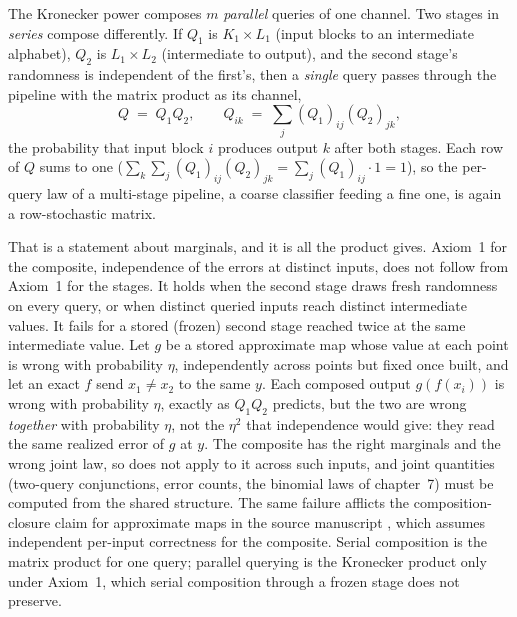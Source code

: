 \begin{remark}
\label{rem:channel-composition}
The Kronecker power composes $m$ \emph{parallel} queries of one channel. Two
stages in \emph{series} compose differently. If $Q_1$ is $K_1 \times L_1$
(input blocks to an intermediate alphabet), $Q_2$ is $L_1 \times L_2$
(intermediate to output), and the second stage's randomness is independent of
the first's, then a \emph{single} query passes through the pipeline with the
matrix product as its channel,
\[
  Q \;=\; Q_1 Q_2,
  \qquad
  Q_{ik} \;=\; \sum_{j} (Q_1)_{ij}(Q_2)_{jk},
\]
the probability that input block $i$ produces output $k$ after both stages.
Each row of $Q$ sums to one ($\sum_k \sum_j (Q_1)_{ij}(Q_2)_{jk} = \sum_j
(Q_1)_{ij} \cdot 1 = 1$), so the per-query law of a multi-stage pipeline, a
coarse classifier feeding a fine one, is again a row-stochastic matrix.

That is a statement about marginals, and it is all the product gives.
Axiom~1 for the composite, independence of the errors at distinct inputs, does
not follow from Axiom~1 for the stages. It holds when
the second stage draws fresh randomness on every query, or when distinct queried
inputs reach distinct intermediate values. It fails for a stored (frozen) second
stage reached twice at the same intermediate value. Let $g$ be a stored
approximate map whose value at each point is wrong with probability $\eta$,
independently across points but fixed once built, and let an exact $f$ send
$x_1 \neq x_2$ to the same $y$. Each composed output $g(f(x_i))$ is wrong with
probability $\eta$, exactly as $Q_1 Q_2$ predicts, but the two are wrong
\emph{together} with probability $\eta$, not the $\eta^2$ that independence
would give: they read the same
realized error of $g$ at $y$. The composite has the right marginals and the
wrong joint law, so  does not apply to it across such
inputs, and joint quantities (two-query conjunctions, error counts, the
binomial laws of chapter~7) must be computed from the shared structure. The
same failure afflicts the composition-closure claim for approximate maps in the
source manuscript \parencite{towell-bernoulli-maps}, which assumes independent
per-input correctness for the composite. Serial composition is the matrix
product for one query; parallel querying is the Kronecker product only under
Axiom~1, which serial composition through a frozen stage does not preserve.
\end{remark}

